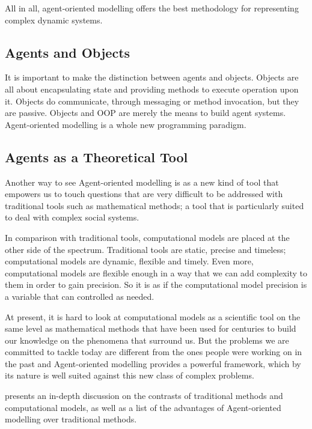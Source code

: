 All in all, agent-oriented modelling offers the best methodology for representing complex dynamic systems.

\subsection{Agents and Objects}

It is important to make the distinction between agents and objects. Objects are all about encapsulating state and providing methods to execute operation upon it. Objects do communicate, through messaging or method invocation, but they are passive. Objects and \ac{OOP} are merely the means to build agent systems. Agent-oriented modelling is a whole new programming paradigm. 

\subsection{Agents as a Theoretical Tool}

Another way to see Agent-oriented modelling is as a new kind of tool that empowers us to touch questions that are very difficult to be addressed with traditional tools such as mathematical methods; a tool that is particularly suited to deal with complex social systems.

In comparison with traditional tools, computational models are placed at the other side of the spectrum. Traditional tools are static, precise and timeless; computational models are dynamic, flexible and timely. Even more, computational models are flexible enough in a way that we can add complexity to them in order to gain precision. So it is as if the computational model precision is a variable that can controlled as needed.

At present, it is hard to look at computational models as a scientific tool on the same level as  mathematical methods that have been used for centuries to build our knowledge on the phenomena that surround us. But the problems we are committed to tackle today are different from the ones people were working on in the past and Agent-oriented modelling provides a powerful framework, which by its nature is well suited against this new class of complex problems.

\citeauthor{miller2007complex} \cite{miller2007complex} presents an in-depth discussion on the contrasts of traditional methods and computational models, as well as a list of the advantages of Agent-oriented modelling over traditional methods. 


